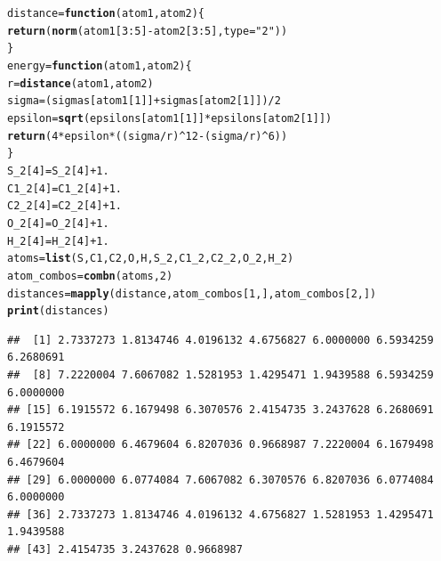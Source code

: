 \documentclass{article}\usepackage[]{graphicx}\usepackage[]{color}
\makeatletter
\newcommand{\hlnum}[1]{\textcolor[rgb]{0.686,0.059,0.569}{#1}}%
\newcommand{\hlstr}[1]{\textcolor[rgb]{0.192,0.494,0.8}{#1}}%
\newcommand{\hlopt}[1]{\textcolor[rgb]{0,0,0}{#1}}%
\newcommand{\hlstd}[1]{\textcolor[rgb]{0.345,0.345,0.345}{#1}}%
\newcommand{\hlkwa}[1]{\textcolor[rgb]{0.161,0.373,0.58}{\textbf{#1}}}%
\newcommand{\hlkwb}[1]{\textcolor[rgb]{0.69,0.353,0.396}{#1}}%
\newcommand{\hlkwc}[1]{\textcolor[rgb]{0.333,0.667,0.333}{#1}}%
\newcommand{\hlkwd}[1]{\textcolor[rgb]{0.737,0.353,0.396}{\textbf{#1}}}%
\newenvironment{kframe}{%
 \def\at@end@of@kframe{}%
 \ifinner\ifhmode%
  \def\at@end@of@kframe{\end{minipage}}%
  \begin{minipage}{\columnwidth}%
 \fi\fi%
 \def\FrameCommand##1{\hskip\@totalleftmargin \hskip-\fboxsep
 \colorbox{shadecolor}{##1}\hskip-\fboxsep
     \hskip-\linewidth \hskip-\@totalleftmargin \hskip\columnwidth}%
 \MakeFramed {\advance\hsize-\width
   \@totalleftmargin\z@ \linewidth\hsize
   \@setminipage}}%
 {\par\unskip\endMakeFramed%
 \at@end@of@kframe}
\newenvironment{knitrout}{}{} %
\makeatother
\begin{document}
\begin{knitrout}
\color{fgcolor}\begin{kframe}
\begin{alltt}
  \hlstd{distance}\hlkwb{=}\hlkwa{function}\hlstd{(}\hlkwc{atom1}\hlstd{,}\hlkwc{atom2}\hlstd{)\{}
    \hlkwd{return}\hlstd{(}\hlkwd{norm}\hlstd{(atom1[}\hlnum{3}\hlopt{:}\hlnum{5}\hlstd{]}\hlopt{-}\hlstd{atom2[}\hlnum{3}\hlopt{:}\hlnum{5}\hlstd{],}\hlkwc{type}\hlstd{=}\hlstr{"2"}\hlstd{))}
  \hlstd{\}}
  \hlstd{energy}\hlkwb{=}\hlkwa{function}\hlstd{(}\hlkwc{atom1}\hlstd{,}\hlkwc{atom2}\hlstd{)\{}
    \hlstd{r}\hlkwb{=}\hlkwd{distance}\hlstd{(atom1,atom2)}
    \hlstd{sigma} \hlkwb{=} \hlstd{(sigmas[atom1[}\hlnum{1}\hlstd{]]}\hlopt{+}\hlstd{sigmas[atom2[}\hlnum{1}\hlstd{]])}\hlopt{/}\hlnum{2}
    \hlstd{epsilon} \hlkwb{=} \hlkwd{sqrt}\hlstd{(epsilons[atom1[}\hlnum{1}\hlstd{]]}\hlopt{*}\hlstd{epsilons[atom2[}\hlnum{1}\hlstd{]])}
    \hlkwd{return}\hlstd{(}\hlnum{4}\hlopt{*}\hlstd{epsilon}\hlopt{*}\hlstd{((sigma}\hlopt{/}\hlstd{r)}\hlopt{^}\hlnum{12}\hlopt{-}\hlstd{(sigma}\hlopt{/}\hlstd{r)}\hlopt{^}\hlnum{6}\hlstd{))}
  \hlstd{\}}
  \hlstd{S_2[}\hlnum{4}\hlstd{]}\hlkwb{=}\hlstd{S_2[}\hlnum{4}\hlstd{]}\hlopt{+}\hlnum{1.}
  \hlstd{C1_2[}\hlnum{4}\hlstd{]}\hlkwb{=}\hlstd{C1_2[}\hlnum{4}\hlstd{]}\hlopt{+}\hlnum{1.}
  \hlstd{C2_2[}\hlnum{4}\hlstd{]}\hlkwb{=}\hlstd{C2_2[}\hlnum{4}\hlstd{]}\hlopt{+}\hlnum{1.}
  \hlstd{O_2[}\hlnum{4}\hlstd{]}\hlkwb{=}\hlstd{O_2[}\hlnum{4}\hlstd{]}\hlopt{+}\hlnum{1.}
  \hlstd{H_2[}\hlnum{4}\hlstd{]}\hlkwb{=}\hlstd{H_2[}\hlnum{4}\hlstd{]}\hlopt{+}\hlnum{1.}
  \hlstd{atoms} \hlkwb{=} \hlkwd{list}\hlstd{(S,C1,C2,O,H,S_2,C1_2,C2_2,O_2,H_2)}
  \hlstd{atom_combos} \hlkwb{=} \hlkwd{combn}\hlstd{(atoms,}\hlnum{2}\hlstd{)}
  \hlstd{distances}\hlkwb{=}\hlkwd{mapply}\hlstd{(distance,atom_combos[}\hlnum{1}\hlstd{,],atom_combos[}\hlnum{2}\hlstd{,])}
  \hlkwd{print}\hlstd{(distances)}
\end{alltt}
\begin{verbatim}
##  [1] 2.7337273 1.8134746 4.0196132 4.6756827 6.0000000 6.5934259 6.2680691
##  [8] 7.2220004 7.6067082 1.5281953 1.4295471 1.9439588 6.5934259 6.0000000
## [15] 6.1915572 6.1679498 6.3070576 2.4154735 3.2437628 6.2680691 6.1915572
## [22] 6.0000000 6.4679604 6.8207036 0.9668987 7.2220004 6.1679498 6.4679604
## [29] 6.0000000 6.0774084 7.6067082 6.3070576 6.8207036 6.0774084 6.0000000
## [36] 2.7337273 1.8134746 4.0196132 4.6756827 1.5281953 1.4295471 1.9439588
## [43] 2.4154735 3.2437628 0.9668987
\end{verbatim}

\end{kframe}
\end{knitrout}
\end{document}
